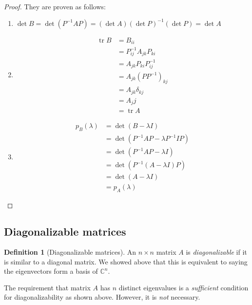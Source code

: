 \documentclass[a4paper]{article}
\theoremstyle{definition}
\newtheorem*{defi}{Definition}
\newcommand{\C}{\mathbb{C}}
\DeclareMathOperator\tr{tr}
\begin{document}
\begin{proof}
  They are proven as follows:
  \begin{enumerate}
  \item $\det B =\det (P^{-1}AP) = (\det A) (\det P)^{-1} (\det P) = \det A$
  \item 
    \begin{align*}
      \tr B &= B_{ii}\\
      &= P_{ij}^{-1} A_{jk} P_{ki}\\
      &= A_{jk} P_{ki}P_{ij}^{-1}\\
      &= A_{jk}(PP^{-1})_{kj}\\
      &= A_{jk}\delta_{kj}\\
      &= A_jj\\
      &= \tr A
    \end{align*}
  \item 
    \begin{align*}
      p_B(\lambda) &= \det(B - \lambda I)\\
      &= \det(P^{-1}AP - \lambda P^{-1}IP)\\
      &= \det(P^{-1}AP - \lambda I)\\
      &= \det(P^{-1}(A - \lambda I)P)\\
      &= \det(A - \lambda I)\\
      &= p_A(\lambda)
    \end{align*}
  \end{enumerate}
\end{proof}
\subsection{Diagonalizable matrices}
\begin{defi}[Diagonalizable matrices]
  An $n\times n$ matrix $A$ is \emph{diagonalizable} if it is similar to a diagonal matrix. We showed above that this is equivalent to saying the eigenvectors form a basis of $\C^n$. 
\end{defi}

The requirement that matrix $A$ has $n$ distinct eigenvalues is a \emph{sufficient} condition for diagonalizability as shown above. However, it is \emph{not} necessary.
\end{document}

